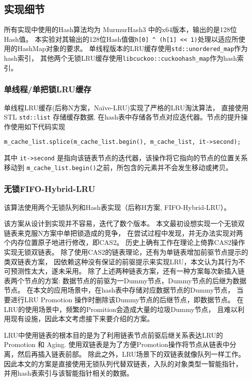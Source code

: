\subsection{实现细节}

所有实现中使用的Hash算法均为 MurmurHash3 中的x64版本，输出的是128位Hash值。
本实验对其输出的128位Hash值做\verb|h[0] ^ (h[1] << 1)|处理以适应所使用的HashMap对象的要求。
单线程版本的LRU缓存使用\verb|std::unordered_map|作为hash索引，
其他两个无锁LRU缓存使用\verb|libcuckoo::cuckoohash_map|作为hash索引。

\subsubsection{单线程/单把锁LRU缓存}

单线程LRU缓存(后称N方案，Na\"{i}ve-LRU)实现了严格的LRU淘汰算法，
直接使用STL \verb|std::list| 存储缓存数据.
在hash表中存储各节点对应迭代器。节点的提升操作使用如下代码实现 
\begin{verbatim}
m_cache_list.splice(m_cache_list.begin(), m_cache_list, it->second);
\end{verbatim}
其中 \verb|it->second| 是指向该链表节点的迭代器，该操作将它指向的节点的位置关系移动到
\verb|m_cache_list.begin()|之前，所包含的元素并不会发生移动或拷贝。

\subsubsection{无锁FIFO-Hybrid-LRU}\label{sec:fifo-hybrid}

该算法使用两个无锁队列和Hash表实现（后称H方案, FIFO-Hybrid-LRU）。

该方案从设计到实现并不容易，迭代了数个版本。
本文最初设想实现一个无锁双链表来克服N方案中单把锁造成的竞争，
在尝试过程中发现，并无办法实现对两个内存位置原子地进行修改，即CAS2。
历史上确有工作在理论上倚靠CAS2操作实现无锁双链表。
除了使用CAS2的链表理论，还有为单链表增加前驱节点提示的类双链表方案，
因依赖这种没有保证的前驱提示来实现LRU，本文认为其行为不可预测性太大，遂未采用。
除了上述两种链表方案，还有一种方案每次新插入链表两个节点的方案:
数据节点的前驱为一Dummy节点，Dummy节点的后继为数据节点。
在本文的应用场景中，在hash表中存储对应数据节点的Dummy节点，
当要进行LRU Promotion 操作时删除该Dummy节点的后继节点，即数据节点。
在LRU的使用场景中，频繁的Promition会造成大量的垃圾Dummy节点，
且难以利用现有设施，因此本文考虑接下来要介绍的方案。

LRU中使用链表的根本目的是为了利用链表节点前驱后继关系表达LRU的 Promotion 和 Aging.
使用双链表是为了方便Promotion操作将节点从链表中分离，然后再插入链表前部。
除此之外，LRU场景下的双链表就像队列一样工作。
因此本文的方案是直接使用无锁队列代替双链表，入队的对象类型一智能指针，
并用hash表索引与该智能指针相关的数据。

